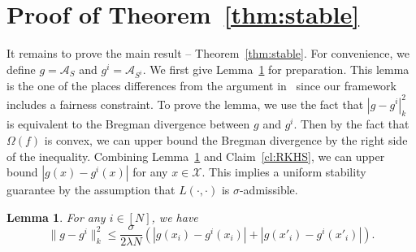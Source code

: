 \documentclass[11pt]{article}
\newtheorem{lemma}[theorem]{Lemma}
\newcommand{\calA}{\mathcal{A}}
\newcommand{\calX}{\mathcal{X}}
\begin{document}
	\section{Proof of Theorem~\ref{thm:stable}}
	\label{sec:main_proof}
	
	It remains to prove the main result -- Theorem~\ref{thm:stable}.
	For convenience, we define $g=\calA_S$ and $g^{i}=\calA_{S^{i}}$.
	We first give Lemma~\ref{lm:bound} for preparation. 
	This lemma is the one of the places differences from the argument in~\cite{bousquet2002stability} since our framework includes a fairness constraint.
	To prove the lemma, we use the fact that $|g-g^i|_k^2$ is equivalent to the Bregman divergence between $g$ and $g^i$. 
	Then by the fact that $\Omega(f)$ is convex, we can upper bound the Bregman divergence by the right side of the inequality.
	Combining Lemma~\ref{lm:bound} and Claim~\ref{cl:RKHS}, we can upper bound $|g(x)-g^i(x)|$ for any $x\in \calX$. 
	This implies a uniform stability guarantee by the assumption that $L(\cdot,\cdot)$ is $\sigma$-admissible.
	
	\begin{lemma}
		\label{lm:bound}
		For any $i\in [N]$, we have
		\[
		\|g-g^{i}\|_k^2 \leq \frac{\sigma}{2\lambda N} \left(|g(x_i)-g^{i}(x_i)|+|g(x'_i)-g^{i}(x'_i)| \right).
		\]
	\end{lemma}
	
\end{document}
